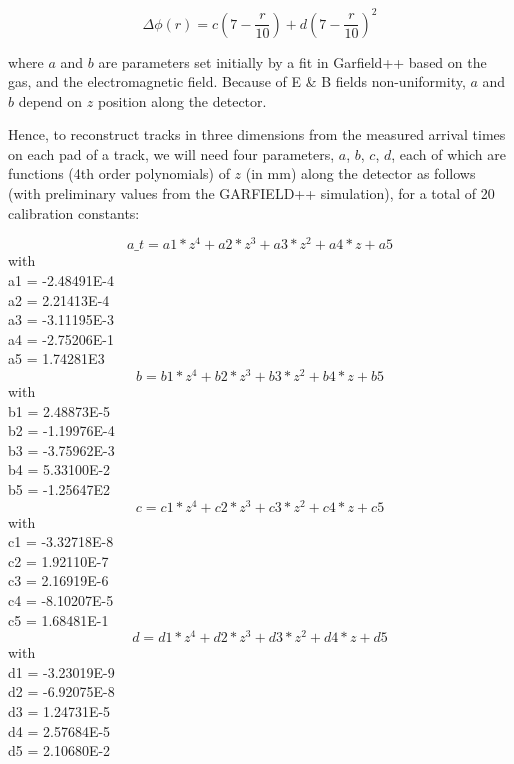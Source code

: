 \documentclass[12pt]{article}
\begin{document}
\begin{equation}
   \Delta \phi (r)= c(7-\frac{r}{10}) + d(7-\frac{r}{10})^2
\end{equation}
  
where $a$ and $b$ are parameters set initially by a fit in Garfield++
based on the gas, and the electromagnetic field. Because of E \& B fields 
non-uniformity, $a$ and $b$ depend on $z$ position along the detector. 

   
   Hence, to reconstruct tracks in three dimensions from the measured arrival times on each
   pad of a track, we will need 
   four parameters, $a$, $b$, $c$, $d$, each of which are functions (4th order polynomials) of $z$ (in mm) along 
   the detector as follows (with preliminary values from the GARFIELD++ simulation), for a total of 20
   calibration constants:

\begin{equation}
a\_t = a1 * z^4 + a2 * z^3 + a3 *z^2 + a4 * z + a5
\end{equation}
with\\
a1 = -2.48491E-4\\
a2 = 2.21413E-4\\
a3 = -3.11195E-3\\
a4 = -2.75206E-1\\
a5 = 1.74281E3\\

\begin{equation}
b = b1 * z^4 + b2 * z^3 + b3 *z^2 + b4 * z + b5
\end{equation}
with\\
b1 = 2.48873E-5\\
b2 = -1.19976E-4\\
b3 = -3.75962E-3\\
b4 = 5.33100E-2\\
b5 = -1.25647E2\\


\begin{equation}
c = c1 * z^4 + c2 * z^3 + c3 *z^2 + c4 * z + c5
\end{equation}
with\\
c1 = -3.32718E-8\\
c2 = 1.92110E-7\\
c3 = 2.16919E-6\\
c4 = -8.10207E-5\\
c5 = 1.68481E-1\\

\begin{equation}
d = d1 * z^4 + d2 * z^3 + d3 *z^2 + d4 * z + d5
\end{equation}
with\\
d1 = -3.23019E-9\\
d2 = -6.92075E-8\\
d3 = 1.24731E-5\\
d4 = 2.57684E-5\\
d5 = 2.10680E-2\\
\end{document}
